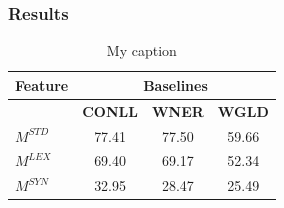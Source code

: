 \documentclass{llncs}
\begin{document}
\subsubsection{Results}
%
\begin{table}[h]
\centering
\begin{tabular}{@{}lccc@{}}
\toprule
             Feature                & \multicolumn{3}{c}{\textbf{Baselines}} \\ \midrule
                & \textbf{CONLL}    & \textbf{WNER}     & \textbf{WGLD}    \\ \cmidrule{2-4}
$M^{STD}$                        & 77.41    & 77.50    & 59.66   \\
$M^{LEX}$                       & 69.40    & 69.17    & 52.34   \\
$M^{SYN}$                        & 32.95    & 28.47    & 25.49   \\ \bottomrule
\end{tabular}
\caption{My caption}
\label{my-label}
\end{table}
\end{document}
